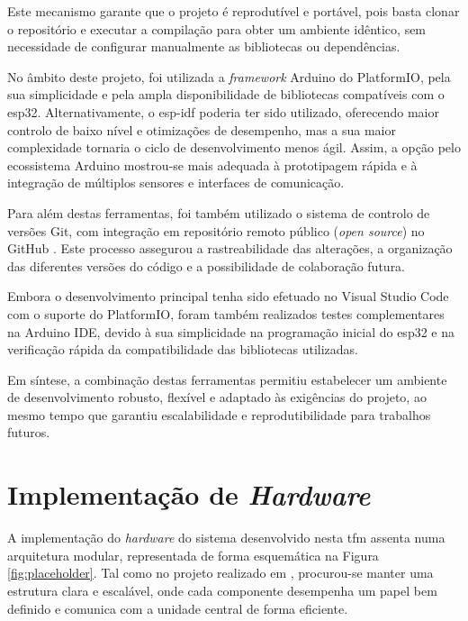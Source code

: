 Este mecanismo garante que o projeto é reprodutível e portável, pois basta clonar o repositório e executar a compilação para obter um ambiente idêntico, sem necessidade de configurar manualmente as bibliotecas ou dependências.

No âmbito deste projeto, foi utilizada a \emph{framework} Arduino do PlatformIO, pela sua simplicidade e pela ampla disponibilidade de bibliotecas compatíveis com o \gls{esp32}. Alternativamente, o \gls{esp-idf} poderia ter sido utilizado, oferecendo maior controlo de baixo nível e otimizações de desempenho, mas a sua maior complexidade tornaria o ciclo de desenvolvimento menos ágil. Assim, a opção pelo ecossistema Arduino mostrou-se mais adequada à prototipagem rápida e à integração de múltiplos sensores e interfaces de comunicação.  

Para além destas ferramentas, foi também utilizado o sistema de controlo de versões Git, com integração em repositório remoto público (\emph{open source}) no GitHub \cite{github-usv}. Este processo assegurou a rastreabilidade das alterações, a organização das diferentes versões do código e a possibilidade de colaboração futura.  

Embora o desenvolvimento principal tenha sido efetuado no Visual Studio Code com o suporte do PlatformIO, foram também realizados testes complementares na Arduino IDE, devido à sua simplicidade na programação inicial do \gls{esp32} e na verificação rápida da compatibilidade das bibliotecas utilizadas.  

Em síntese, a combinação destas ferramentas permitiu estabelecer um ambiente de desenvolvimento robusto, flexível e adaptado às exigências do projeto, ao mesmo tempo que garantiu escalabilidade e reprodutibilidade para trabalhos futuros.

\section{Implementação de \emph{Hardware}}
\label{sec:implementacao-hardware}

A implementação do \emph{\emph{hardware}} do sistema desenvolvido nesta \gls{tfm} assenta numa arquitetura modular, representada de forma esquemática na Figura \ref{fig:placeholder}. Tal como no projeto realizado em \cite{didactic-robot-thesis}, procurou-se manter uma estrutura clara e escalável, onde cada componente desempenha um papel bem definido e comunica com a unidade central de forma eficiente.  

